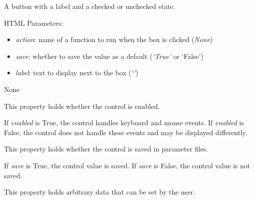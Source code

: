 \documentclass[letterpaper,10pt,english]{sphinxmanual}
\begin{document}
\begin{fulllineitems}
\label{api:controls.CheckBox}
A button with a label and a checked or unchecked state.

HTML Parameters:
\begin{itemize}
\item {} 
\emph{action}: name of a function to run when the box is clicked (\emph{None})

\item {} 
\emph{save}: whether to save the value as a default (\emph{`True'} or `False')

\item {} 
\emph{label}: text to display next to the box (\emph{`'})

\end{itemize}

\begin{fulllineitems}
\label{api:controls.CheckBox.action}
None

\end{fulllineitems}


\begin{fulllineitems}
\label{api:controls.CheckBox.enabled}
This property holds whether the control is enabled.

If \emph{enabled} is True, the control handles keyboard and mouse events.
If \emph{enabled} is False, the control does not handle these events and may
be displayed differently.

\end{fulllineitems}


\begin{fulllineitems}
\label{api:controls.CheckBox.save}
This property holds whether the control is saved in parameter files.

If \emph{save} is True, the control value is saved.
If \emph{save} is False, the control value is not saved.

\end{fulllineitems}


\begin{fulllineitems}
\label{api:controls.CheckBox.user}
This property holds arbitrary data that can be set by the user.


\end{fulllineitems}
\end{fulllineitems}
\end{document}
